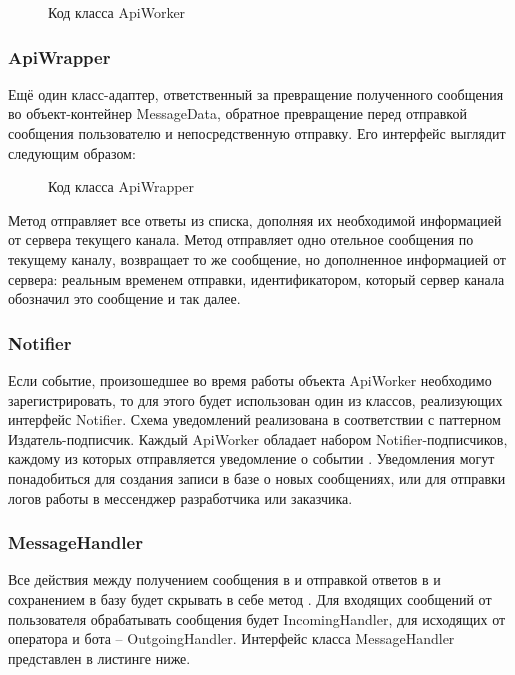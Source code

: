     \begin{figure}[!h]
        \centering
        
        \caption{Код класса ApiWorker}
        \label{fig:api_worker}
    \end{figure}

    \subsubsection*{ApiWrapper}
    Ещё один класс-адаптер, ответственный за превращение полученного сообщения 
    во объект-контейнер MessageData, обратное превращение перед отправкой
    сообщения пользователю и непосредственную отправку.
    Его интерфейс выглядит следующим образом:

    \begin{figure}[!h]
        \centering
        
        \caption{Код класса ApiWrapper}
        \label{fig:api_wrapper}
    \end{figure}
    
    Метод  отправляет все ответы из списка, дополняя их
    необходимой информацией от сервера текущего канала. 
    Метод  отправляет одно отельное сообщения по текущему каналу,
    возвращает то же сообщение, но дополненное информацией от сервера: реальным временем
    отправки, идентификатором, который сервер канала обозначил это сообщение и так далее.

    \subsubsection*{Notifier}
    Если событие, произошедшее во время работы объекта ApiWorker необходимо
    зарегистрировать, то для этого будет использован один из классов,
    реализующих интерфейс Notifier.
    Схема уведомлений реализована в соответствии с паттерном Издатель-подписчик.
    Каждый ApiWorker обладает набором Notifier-подписчиков, каждому из которых
    отправляется уведомление о событии .
    Уведомления могут понадобиться для создания записи в базе о новых сообщениях,
    или для отправки логов работы в мессенджер разработчика или заказчика.

    \subsubsection*{MessageHandler}
    Все действия между получением сообщения в  и отправкой ответов
    в  и сохранением в базу будет скрывать в себе метод
    . Для входящих сообщений от пользователя обрабатывать
    сообщения будет IncomingHandler, для исходящих от оператора и бота -- OutgoingHandler.
    Интерфейс класса MessageHandler представлен в листинге ниже.

